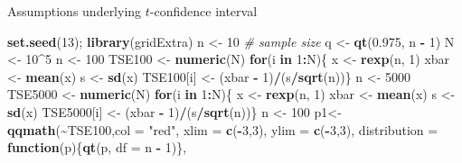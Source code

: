 \documentclass[
  ignorenonframetext,
]{beamer}
\newenvironment{Shaded}{\begin{snugshade}}{\end{snugshade}}
\newcommand{\AttributeTok}[1]{\textcolor[rgb]{0.13,0.29,0.53}{#1}}
\newcommand{\CommentTok}[1]{\textcolor[rgb]{0.56,0.35,0.01}{\textit{#1}}}
\newcommand{\ControlFlowTok}[1]{\textcolor[rgb]{0.13,0.29,0.53}{\textbf{#1}}}
\newcommand{\DecValTok}[1]{\textcolor[rgb]{0.00,0.00,0.81}{#1}}
\newcommand{\FloatTok}[1]{\textcolor[rgb]{0.00,0.00,0.81}{#1}}
\newcommand{\FunctionTok}[1]{\textcolor[rgb]{0.13,0.29,0.53}{\textbf{#1}}}
\newcommand{\NormalTok}[1]{#1}
\newcommand{\OtherTok}[1]{\textcolor[rgb]{0.56,0.35,0.01}{#1}}
\newcommand{\SpecialCharTok}[1]{\textcolor[rgb]{0.81,0.36,0.00}{\textbf{#1}}}
\newcommand{\StringTok}[1]{\textcolor[rgb]{0.31,0.60,0.02}{#1}}
\begin{document}
\begin{frame}[fragile]{Assumptions underlying \(t\)-confidence interval}
\label{assumptions-underlying-t-confidence-interval-7}
\tiny

\begin{Shaded}
\begin{Highlighting}[]
\FunctionTok{set.seed}\NormalTok{(}\DecValTok{13}\NormalTok{); }\FunctionTok{library}\NormalTok{(gridExtra)}
\NormalTok{n }\OtherTok{\textless{}{-}} \DecValTok{10}           \CommentTok{\# sample size}
\NormalTok{q }\OtherTok{\textless{}{-}} \FunctionTok{qt}\NormalTok{(}\FloatTok{0.975}\NormalTok{, n }\SpecialCharTok{{-}} \DecValTok{1}\NormalTok{)}
\NormalTok{N }\OtherTok{\textless{}{-}} \DecValTok{10}\SpecialCharTok{\^{}}\DecValTok{5}
\NormalTok{n }\OtherTok{\textless{}{-}} \DecValTok{100}
\NormalTok{TSE100 }\OtherTok{\textless{}{-}} \FunctionTok{numeric}\NormalTok{(N)}
\ControlFlowTok{for}\NormalTok{(i }\ControlFlowTok{in} \DecValTok{1}\SpecialCharTok{:}\NormalTok{N)\{}
\NormalTok{  x }\OtherTok{\textless{}{-}} \FunctionTok{rexp}\NormalTok{(n, }\DecValTok{1}\NormalTok{)}
\NormalTok{  xbar }\OtherTok{\textless{}{-}} \FunctionTok{mean}\NormalTok{(x)}
\NormalTok{  s }\OtherTok{\textless{}{-}} \FunctionTok{sd}\NormalTok{(x)}
\NormalTok{  TSE100[i] }\OtherTok{\textless{}{-}}\NormalTok{ (xbar }\SpecialCharTok{{-}} \DecValTok{1}\NormalTok{)}\SpecialCharTok{/}\NormalTok{(s}\SpecialCharTok{/}\FunctionTok{sqrt}\NormalTok{(n))\}}
\NormalTok{n }\OtherTok{\textless{}{-}} \DecValTok{5000}
\NormalTok{TSE5000 }\OtherTok{\textless{}{-}} \FunctionTok{numeric}\NormalTok{(N)}
\ControlFlowTok{for}\NormalTok{(i }\ControlFlowTok{in} \DecValTok{1}\SpecialCharTok{:}\NormalTok{N)\{}
\NormalTok{  x }\OtherTok{\textless{}{-}} \FunctionTok{rexp}\NormalTok{(n, }\DecValTok{1}\NormalTok{)}
\NormalTok{  xbar }\OtherTok{\textless{}{-}} \FunctionTok{mean}\NormalTok{(x)}
\NormalTok{  s }\OtherTok{\textless{}{-}} \FunctionTok{sd}\NormalTok{(x)}
\NormalTok{  TSE5000[i] }\OtherTok{\textless{}{-}}\NormalTok{ (xbar }\SpecialCharTok{{-}} \DecValTok{1}\NormalTok{)}\SpecialCharTok{/}\NormalTok{(s}\SpecialCharTok{/}\FunctionTok{sqrt}\NormalTok{(n))\}}
\NormalTok{n }\OtherTok{\textless{}{-}} \DecValTok{100}
\NormalTok{p1}\OtherTok{\textless{}{-}}\FunctionTok{qqmath}\NormalTok{(}\SpecialCharTok{\textasciitilde{}}\NormalTok{TSE100,}\AttributeTok{col =} \StringTok{"red"}\NormalTok{, }\AttributeTok{xlim =} \FunctionTok{c}\NormalTok{(}\SpecialCharTok{{-}}\DecValTok{3}\NormalTok{,}\DecValTok{3}\NormalTok{), }\AttributeTok{ylim =} \FunctionTok{c}\NormalTok{(}\SpecialCharTok{{-}}\DecValTok{3}\NormalTok{,}\DecValTok{3}\NormalTok{), }\AttributeTok{distribution =} \ControlFlowTok{function}\NormalTok{(p)\{}\FunctionTok{qt}\NormalTok{(p, }\AttributeTok{df =}\NormalTok{ n }\SpecialCharTok{{-}} \DecValTok{1}\NormalTok{)\}, }

\end{Highlighting}
\end{Shaded}
\end{frame}
\end{document}
